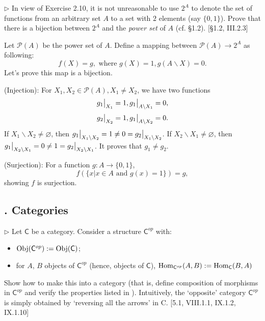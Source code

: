 \begin{problem}[2.11]
  $\rhd$ In view of Exercise 2.10, it is not unreasonable to use $2^A$ to denote
  the set of functions from an arbitrary set $A$ to a set with $2$ elements (say
  $\{0,1\}$). Prove that there is a bijection between $2^A$ and the \textit{power
    set} of $A$ (cf. \S1.2). [\S1.2, III.2.3]
\end{problem}

\begin{solution}
Let $\mathcal{P}(A)$ be the power set of $A$. Define a mapping between $\mathcal{P}(A)\to 2^A$ as following:
$$f(X) = g, \text{ where } g(X) = 1, g(A\backslash X) = 0.$$ Let's prove this map is a bijection.

(Injection): For $X_1, X_2\in \mathcal{P}(A), X_1\neq X_2$, we have two functions 
$$g_1\big{|}_{X_1} = 1, g_1\big{|}_{A\backslash X_1} = 0,$$
$$g_2\big{|}_{X_2} = 1, g_1\big{|}_{A\backslash X_2} = 0.$$
If $X_1\backslash X_2\neq \varnothing$, then $g_1\big{|}_{X_1\backslash X_2} = 1\neq 0 = g_2\big{|}_{X_1\backslash X_2}$.
If $X_2\backslash X_1\neq \varnothing$, then $g_1\big{|}_{X_2\backslash X_1} = 0\neq 1 = g_2\big{|}_{X_2\backslash X_1}$. 
It proves that $g_1 \neq g_2$.

(Surjection): For a function $g: A\to \{0,1\}$, $$f(\{x| x\in A \text{ and } g(x)= 1\}) = g,$$
showing $f$ is surjection.
\end{solution}


\subsection{. Categories}

\hypertarget{Exercise I.3.1}{}
\begin{problem}[3.1]
  $\rhd$ Let $\mathsf{C}$ be a category. Consider a structure $\mathsf{C}^{op}$ with:
  \begin{itemize}
  \item $\mathrm{Obj}(\mathsf{C}^{op}) := \mathrm{Obj}(\mathsf{C})$;
  \item for $A$, $B$ objects of $\mathsf{C}^{op}$ (hence, objects of $\mathsf{C}$), $\mathrm{Hom}_{\mathsf{C}^{op}} (A,B) := \mathrm{Hom}_\mathsf{C}(B,A)$
  \end{itemize}
  Show how to make this into a category (that is, define composition of morphisms
  in $\mathsf{C}^{op}$ and verify the properties listed in ).
  Intuitively, the `opposite' category $\mathsf{C}^{op}$ is simply obtained by `reversing all the
  arrows' in C. [5.1, \textsection VIII.1.1, \textsection IX.1.2, IX.1.10]
\end{problem}

